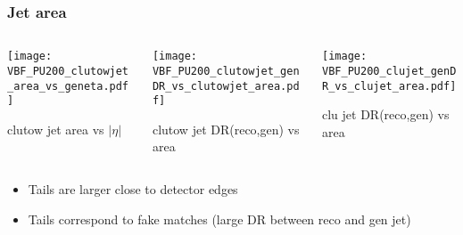 \documentclass[8pt]{beamer}
\begin{document}
\begin{frame}
 \frametitle{Jet area}
 
 \begin{columns}
  \begin{column}{0.4\textwidth}
   \texttt{[image: VBF\_PU200\_clutowjet\_area\_vs\_geneta.pdf]}
   
   clutow jet area vs $|\eta|$
  \end{column}
  \begin{column}{0.4\textwidth}
   \texttt{[image: VBF\_PU200\_clutowjet\_genDR\_vs\_clutowjet\_area.pdf]}
   
   clutow jet DR(reco,gen) vs area
  \end{column}
  \begin{column}{0.4\textwidth}
   \texttt{[image: VBF\_PU200\_clujet\_genDR\_vs\_clujet\_area.pdf]}
   
   clu jet DR(reco,gen) vs area
  \end{column}
 \end{columns}

 \vspace{20pt}
 
 \begin{itemize}
  \item Tails are larger close to detector edges
  \item Tails correspond to fake matches (large DR between reco and gen jet)
 \end{itemize}

\end{frame}
\end{document}
